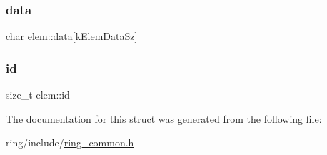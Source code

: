 \subsubsection{\texorpdfstring{data}{data}}
{\footnotesize\ttfamily char elem\+::data\mbox{[}\hyperlink{ring__common_8h_a9036cd5ac8a8aa2ff3a4e4e00536f6d6}{k\+Elem\+Data\+Sz}\mbox{]}}

\mbox{\label{structelem_a76c978bdb5b9645b0b2101b54b456d01}} 
\subsubsection{\texorpdfstring{id}{id}}
{\footnotesize\ttfamily size\+\_\+t elem\+::id}



The documentation for this struct was generated from the following file\+:\begin{DoxyCompactItemize}
\item 
ring/include/\hyperlink{ring__common_8h}{ring\+\_\+common.\+h}\end{DoxyCompactItemize}
